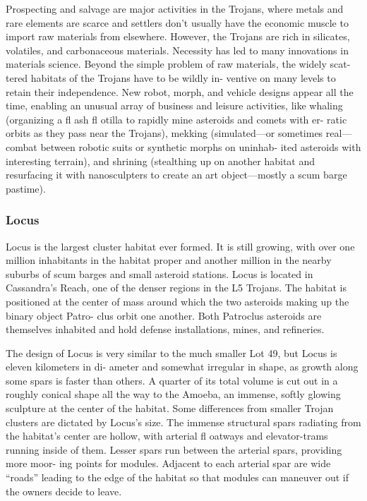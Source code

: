Prospecting and salvage are major activities in 
the Trojans, where metals and rare elements are 
scarce and settlers don't usually have the economic 
muscle to import raw materials from elsewhere. 
However, the Trojans are rich in silicates, volatiles, 
and carbonaceous materials. Necessity has led to 
many innovations in materials science. Beyond the 
simple problem of raw materials, the widely scat-
tered habitats of the Trojans have to be wildly in-
ventive on many levels to retain their independence. 
New robot, morph, and vehicle designs appear all 
the time, enabling an unusual array of business and 
leisure activities, like whaling (organizing a fl ash 
fl otilla to rapidly mine asteroids and comets with er-
ratic orbits as they pass near the Trojans), mekking 
(simulated—or sometimes real—combat between 
robotic suits or synthetic morphs on uninhab-
ited asteroids with interesting terrain), and shrining 
(stealthing up on another habitat and resurfacing it 
with nanosculpters to create an art object—mostly a 
scum barge pastime).

\subsubsection{Locus}

Locus is the largest cluster habitat ever formed. It 
is still growing, with over one million inhabitants 
in the habitat proper and another million in the 
nearby suburbs of scum barges and small asteroid 
stations. Locus is located in Cassandra's Reach, one 
of the denser regions in the L5 Trojans. The habitat 
is positioned at the center of mass around which the 
two asteroids making up the binary object Patro-
clus orbit one another. Both Patroclus asteroids are 
themselves inhabited and hold defense installations, 
mines, and refineries.

The design of Locus is very similar to the much 
smaller Lot 49, but Locus is eleven kilometers in di-
ameter and somewhat irregular in shape, as growth 
along some spars is faster than others. A quarter of its 
total volume is cut out in a roughly conical shape all 
the way to the Amoeba, an immense, softly glowing 
sculpture at the center of the habitat. Some differences 
from smaller Trojan clusters are dictated by Locus's 
size. The immense structural spars radiating from the 
habitat's center are hollow, with arterial fl oatways and 
elevator-trams running inside of them. Lesser spars 
run between the arterial spars, providing more moor-
ing points for modules. Adjacent to each arterial spar 
are wide ``roads'' leading to the edge of the habitat so 
that modules can maneuver out if the owners decide 
to leave.

